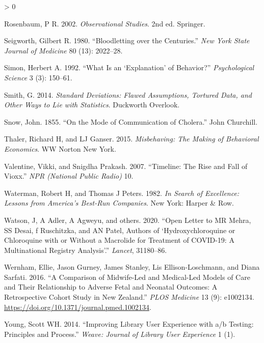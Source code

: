 \documentclass[
  10pt,
  b5paper]{book}
\newlength{\cslhangindent}
\newenvironment{CSLReferences}[2] %
 {%
  \setlength{\parindent}{0pt}
  \ifodd #1 \everypar{\setlength{\hangindent}{\cslhangindent}}\ignorespaces\fi
  \ifnum #2 > 0
  \setlength{\parskip}{#2\baselineskip}
  \fi
 }%
 {}
\begin{document}
\begin{CSLReferences}{1}{0}
\leavevmode\hypertarget{ref-RosBook}{}%
Rosenbaum, P R. 2002. \emph{Observational Studies}. 2nd ed. Springer.

\leavevmode\hypertarget{ref-seigworth1980bloodletting}{}%
Seigworth, Gilbert R. 1980. {``Bloodletting over the Centuries.''} \emph{New York State Journal of Medicine} 80 (13): 2022--28.

\leavevmode\hypertarget{ref-simon1992explanation}{}%
Simon, Herbert A. 1992. {``What Is an {`Explanation'} of Behavior?''} \emph{Psychological Science} 3 (3): 150--61.

\leavevmode\hypertarget{ref-smith-sd}{}%
Smith, G. 2014. \emph{Standard Deviations: Flawed Assumptions, Tortured Data, and Other Ways to Lie with Statistics}. Duckworth Overlook.

\leavevmode\hypertarget{ref-snow1849mode}{}%
Snow, John. 1855. {``On the Mode of Communication of Cholera.''} John Churchill.

\leavevmode\hypertarget{ref-thaler2015misbehaving}{}%
Thaler, Richard H, and LJ Ganser. 2015. \emph{Misbehaving: The Making of Behavioral Economics}. WW Norton New York.

\leavevmode\hypertarget{ref-valentine2007timeline}{}%
Valentine, Vikki, and Snigdha Prakash. 2007. {``Timeline: The Rise and Fall of Vioxx.''} \emph{NPR (National Public Radio)} 10.

\leavevmode\hypertarget{ref-waterman1982search}{}%
Waterman, Robert H, and Thomas J Peters. 1982. \emph{In Search of Excellence: Lessons from America's Best-Run Companies}. New York: Harper \& Row.

\leavevmode\hypertarget{ref-watson2020open}{}%
Watson, J, A Adler, A Agweyu, and others. 2020. {``Open Letter to MR Mehra, SS Desai, f Ruschitzka, and AN Patel, Authors of {`Hydroxychloroquine or Chloroquine with or Without a Macrolide for Treatment of COVID-19: A Multinational Registry Analysis'}.''} \emph{Lancet}, 31180--86.

\leavevmode\hypertarget{ref-wernham_EtAl_2016}{}%
Wernham, Ellie, Jason Gurney, James Stanley, Lis Ellison-Loschmann, and Diana Sarfati. 2016. {``A Comparison of Midwife-Led and Medical-Led Models of Care and Their Relationship to Adverse Fetal and Neonatal Outcomes: A Retrospective Cohort Study in New Zealand.''} \emph{PLOS Medicine} 13 (9): e1002134. \url{https://doi.org/10.1371/journal.pmed.1002134}.

\leavevmode\hypertarget{ref-young2014improving}{}%
Young, Scott WH. 2014. {``Improving Library User Experience with a/b Testing: Principles and Process.''} \emph{Weave: Journal of Library User Experience} 1 (1).

\end{CSLReferences}
\end{document}
